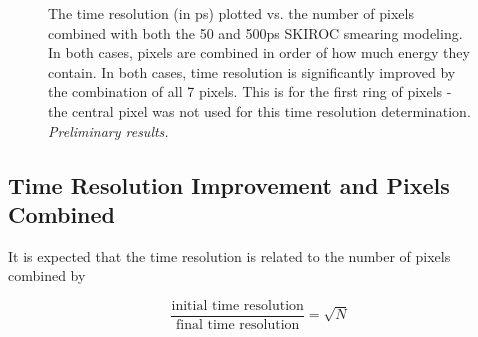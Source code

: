 \documentclass[twocolumn,aps,prd,reprint]{revtex4-1}
\begin{document}
\begin{figure}[!htbp]
\centering
{} 
\caption{The time resolution (in ps) plotted vs. the number of pixels combined with both the 50 and 500ps SKIROC smearing modeling. In both cases, pixels are combined in order of how much energy they contain. In both cases, time resolution is significantly improved by the combination of all 7 pixels. This is for the first ring of pixels - the central pixel was not used for this time resolution determination. \textit{Preliminary results.}}
\label{500 and 50 smearing no center}
\end{figure}

\subsection{Time Resolution Improvement and Pixels Combined}

It is expected that the time resolution is related to the number of pixels combined by

\begin{equation}
\frac{\text{initial time resolution}}{\text{final time resolution}} = \sqrt{N}
\label{square root N}
\end{equation}
\end{document}
